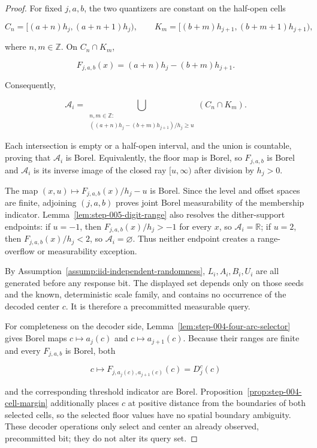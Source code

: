 \begin{proof}
For fixed \(j,a,b\), the two quantizers are constant on the half-open cells

\[
C_{n}=[(a+n)h_j,(a+n+1)h_j),
\qquad
K_{m}=[(b+m)h_{j+1},(b+m+1)h_{j+1}),
\]

where \(n,m\in\mathbb Z\). On \(C_n\cap K_m\),

\[
F_{j,a,b}(x)=(a+n)h_j-(b+m)h_{j+1}.
\]

Consequently,

\[
\mathcal A_i
=\bigcup_{\substack{n,m\in\mathbb Z:\\
((a+n)h_j-(b+m)h_{j+1})/h_j\geq u}}
(C_n\cap K_m).
\]

Each intersection is empty or a half-open interval, and the union is countable, proving that \(\mathcal A_i\) is Borel. Equivalently, the floor map is Borel, so \(F_{j,a,b}\) is Borel and \(\mathcal A_i\) is its inverse image of the closed ray \([u,\infty)\) after division by \(h_j>0\).

The map \((x,u)\mapsto F_{j,a,b}(x)/h_j-u\) is Borel. Since the level and offset spaces are finite, adjoining \((j,a,b)\) proves joint Borel measurability of the membership indicator. Lemma~\ref{lem:step-005-digit-range} also resolves the dither-support endpoints: if \(u=-1\), then \(F_{j,a,b}(x)/h_j>-1\) for every \(x\), so \(\mathcal A_i=\mathbb R\); if \(u=2\), then \(F_{j,a,b}(x)/h_j<2\), so \(\mathcal A_i=\varnothing\). Thus neither endpoint creates a range-overflow or measurability exception.

By Assumption~\ref{assump:iid-independent-randomness}, \(L_i,A_i,B_i,U_i\) are all generated before any response bit. The displayed set depends only on those seeds and the known, deterministic scale family, and contains no occurrence of the decoded center \(c\). It is therefore a precommitted measurable query.

For completeness on the decoder side, Lemma~\ref{lem:step-004-four-arc-selector} gives Borel maps \(c\mapsto a_j(c)\) and \(c\mapsto a_{j+1}(c)\). Because their ranges are finite and every \(F_{j,a,b}\) is Borel, both

\[
c\longmapsto
F_{j,a_j(c),a_{j+1}(c)}(c)=D_j^c(c)
\]

and the corresponding threshold indicator are Borel. Proposition~\ref{prop:step-004-cell-margin} additionally places \(c\) at positive distance from the boundaries of both selected cells, so the selected floor values have no spatial boundary ambiguity. These decoder operations only select and center an already observed, precommitted bit; they do not alter its query set.
\end{proof}

